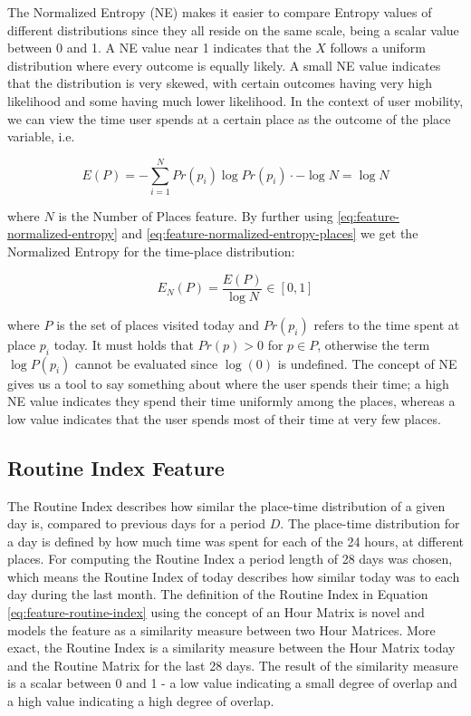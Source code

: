 The Normalized Entropy (NE) makes it easier to compare Entropy values of different distributions since they all reside on the same scale, being a scalar value between  0 and 1. A NE value near 1 indicates that the $X$ follows a uniform distribution where every outcome is equally likely. A small NE value indicates that the distribution is very skewed, with certain outcomes having very high likelihood and some having much lower likelihood.  In the context of user mobility, we can view the time user spends at a certain place as the outcome of the place variable, i.e. 

\begin{equation}
\label{eq:feature-normalized-entropy-places}
E(P) = - \sum_{i=1}^{N} Pr(p_i) \log Pr(p_i)
\cdot -\log N = \log N 
\end{equation}

where $N$ is the Number of Places feature. By further using \eqref{eq:feature-normalized-entropy} and \eqref{eq:feature-normalized-entropy-places} we get the Normalized Entropy for the time-place distribution:

\begin{equation}
\label{eq:feature-normalized-entropy}
E_N(P) = \frac{E(P)}{\log N} \in [0,1]
\end{equation}

where $P$ is the set of places visited today and $Pr(p_i)$ refers to the time spent at place $p_i$ today. It must holds that $Pr(p) > 0$ for $p \in P$, otherwise the term $\log P(p_i)$ cannot be evaluated since $\log(0)$ is undefined. The concept of NE gives us a tool to say something about where the user spends their time; a high NE value indicates they spend their time uniformly among the places, whereas a low value indicates that the user spends most of their time at very few places. 

\subsection{Routine Index Feature}
\label{sub:routine-index}
The Routine Index describes how similar the place-time distribution of a given day is, compared to previous days for a period $D$. The place-time distribution for a day is defined by how much time was spent for each of the 24 hours, at different places. For computing the Routine Index a period length of 28 days was chosen, which means the Routine Index of today describes how similar today was to each day during the last month. The definition of the Routine Index in Equation \eqref{eq:feature-routine-index} using the concept of an Hour Matrix is novel and models the feature as a similarity measure between two Hour Matrices. More exact, the Routine Index is a similarity measure between the Hour Matrix today and the Routine Matrix for the last 28 days. The result of the similarity measure is a scalar between 0 and 1 - a low value indicating a small degree of overlap and a high value indicating a high degree of overlap.\\

